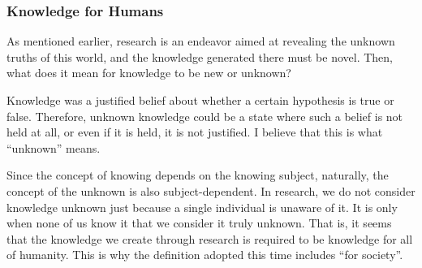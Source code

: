 \subsubsection{Knowledge for Humans}
As mentioned earlier, research is an endeavor aimed at revealing the unknown truths of this world, and the knowledge generated there must be novel. Then, what does it mean for knowledge to be new or unknown?

Knowledge was a justified belief about whether a certain hypothesis is true or false. Therefore, unknown knowledge could be a state where such a belief is not held at all, or even if it is held, it is not justified. I believe that this is what ``unknown'' means.

Since the concept of knowing depends on the knowing subject, naturally, the concept of the unknown is also subject-dependent. In research, we do not consider knowledge unknown just because a single individual is unaware of it. It is only when none of us know it that we consider it truly unknown. That is, it seems that the knowledge we create through research is required to be knowledge for all of humanity. This is why the definition adopted this time includes ``for society''.







